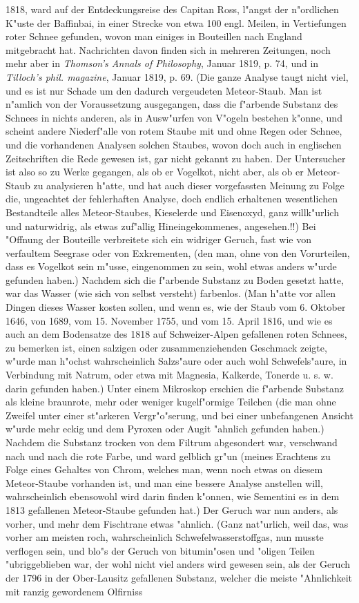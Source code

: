 \documentclass[a4paper, 11pt, oneside, polutonikogreek, german]{article}
\begin{document}
1818, ward auf der Entdeckungsreise des Capitan Ross, l"angst der n"ordlichen K"uste der Baffinbai, in einer Strecke von etwa 100 engl. Meilen, in Vertiefungen roter Schnee gefunden, wovon man einiges in Bouteillen nach England mitgebracht hat. Nachrichten davon finden sich in mehreren Zeitungen, noch mehr aber in \emph{Thomson's Annals of Philosophy}, Januar 1819, p. 74, und in \emph{Tilloch's phil. magazine}, Januar 1819, p. 69. (Die ganze Analyse taugt nicht viel, und es ist nur Schade um den dadurch vergeudeten Meteor-Staub. Man ist n"amlich von der Voraussetzung ausgegangen, dass die f"arbende Substanz des Schnees in nichts anderen, als in Ausw"urfen von V"ogeln bestehen k"onne, und scheint andere Niederf"alle von rotem Staube mit und ohne Regen oder Schnee, und die vorhandenen Analysen solchen Staubes, wovon doch auch in englischen Zeitschriften die Rede gewesen ist, gar nicht gekannt zu haben. Der Untersucher ist also so zu Werke gegangen, als ob er Vogelkot, nicht aber, als ob er Meteor-Staub zu analysieren h"atte, und hat auch dieser vorgefassten Meinung zu Folge die, ungeachtet der fehlerhaften Analyse, doch endlich erhaltenen wesentlichen Bestandteile alles Meteor-Staubes, Kieselerde und Eisenoxyd, ganz willk"urlich und naturwidrig, als etwas zuf"allig Hineingekommenes, angesehen.!!) Bei "Offnung der Bouteille verbreitete sich ein widriger Geruch, fast wie von verfaultem Seegrase oder von Exkrementen, (den man, ohne von den Vorurteilen, dass es Vogelkot sein m"usse, eingenommen zu sein, wohl etwas anders w"urde gefunden haben.) Nachdem sich die f"arbende Substanz zu Boden gesetzt hatte, war das Wasser (wie sich von selbst versteht) farbenlos. (Man h"atte vor allen Dingen dieses Wasser kosten sollen, und wenn es, wie der Staub vom 6. Oktober 1646, von 1689, vom 15. November 1755, und vom 15. April 1816, und wie es auch an dem Bodensatze des 1818 auf Schweizer-Alpen gefallenen roten Schnees, zu bemerken ist, einen salzigen oder zusammenziehenden Geschmack zeigte, w"urde man h"ochst wahrscheinlich Salzs"aure oder auch wohl Schwefels"aure, in Verbindung mit Natrum, oder etwa mit Magnesia, Kalkerde, Tonerde u. s. w. darin gefunden haben.) Unter einem Mikroskop erschien die f"arbende Substanz als kleine braunrote, mehr oder weniger kugelf"ormige Teilchen (die man ohne Zweifel unter einer st"arkeren Vergr"o"serung, und bei einer unbefangenen Ansicht w"urde mehr eckig und dem Pyroxen oder Augit "ahnlich gefunden haben.) Nachdem die Substanz trocken von dem Filtrum abgesondert war, verschwand nach und nach die rote Farbe, und ward gelblich gr"un (meines Erachtens zu Folge eines Gehaltes von Chrom, welches man, wenn noch etwas on diesem Meteor-Staube vorhanden ist, und man eine bessere Analyse anstellen will, wahrscheinlich ebensowohl wird darin finden k"onnen, wie Sementini es in dem 1813 gefallenen Meteor-Staube gefunden hat.) Der Geruch war nun anders, als vorher, und mehr dem Fischtrane etwas "ahnlich. (Ganz nat"urlich, weil das, was vorher am meisten roch, wahrscheinlich Schwefelwasserstoffgas, nun musste verflogen sein, und blo"s der Geruch von bitumin"osen und "oligen Teilen "ubriggeblieben war, der wohl nicht viel anders wird gewesen sein, als der Geruch der 1796 in der Ober-Lausitz gefallenen Substanz, welcher die meiste "Ahnlichkeit mit ranzig gewordenem Olfirniss 
\end{document}
